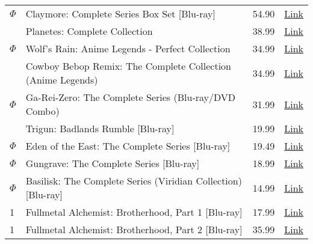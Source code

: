 \documentclass[12pt]{article}
\begin{document}
\begin{longtable}{ | p{1.3cm} | p{12cm} | l | l |}
$\Phi$ & Claymore: Complete Series Box Set [Blu-ray] & 54.90 & \href{http://www.amazon.com/Claymore-Complete-Box-Set-Blu-ray/dp/B002Y0KR66/ref=wl_it_dp_o_npd?ie=UTF8&coliid=I1CB6CCI6ECULD&colid=2CEAJ0SZHT29K}{Link} \\
& Planetes: Complete Collection & 38.99 & \href{http://www.amazon.com/Planetes-Complete-Collection-Nao-Nagasawa/dp/B000HT3876/ref=wl_it_dp_o_npd?ie=UTF8&coliid=I2E3NIZ8K55X27&colid=2CEAJ0SZHT29K}{Link} \\
$\Phi$ & Wolf's Rain: Anime Legends - Perfect Collection & 34.99 & \href{http://www.amazon.com/Wolfs-Rain-Legends-Perfect-Collection/dp/B001K98MLO/ref=sr_1_1?s=movies-tv&ie=UTF8&qid=1322589189&sr=1-1}{Link} \\
& Cowboy Bebop Remix: The Complete Collection (Anime Legends) & 34.99 & \href{http://www.amazon.com/Cowboy-Bebop-Remix-Complete-Collection/dp/B00102FF7U/ref=pd_bxgy_mov_text_c}{Link} \\
$\Phi$ & Ga-Rei-Zero: The Complete Series (Blu-ray/DVD Combo) & 31.99 & \href{http://www.amazon.com/Ga-Rei-Zero-Complete-Blu-ray-DVD-Combo/dp/B004DMIIT6/ref=pd_sim_mov_19}{Link} \\
& Trigun: Badlands Rumble [Blu-ray] & 19.99 & \href{http://www.amazon.com/Trigun-Badlands-Blu-ray-Luci-Christian/dp/B00576U9JE/ref=pd_bxgy_mov_text_c}{Link} \\
$\Phi$ & Eden of the East: The Complete Series [Blu-ray] & 19.49 & \href{http://www.amazon.com/Eden-East-Complete-Jason-Liebrecht/dp/B003SPDS8A/ref=wl_it_dp_o_pd_T1?ie=UTF8&coliid=I3CCTEO78VNIHJ&colid=2CEAJ0SZHT29K}{Link} \\
$\Phi$ & Gungrave: The Complete Series [Blu-ray] & 18.99 & \href{http://www.amazon.com/Gungrave-Complete-Blu-ray-Ron-Allen/dp/B004TP55PM/ref=sr_1_1?s=movies-tv&ie=UTF8&qid=1322588552&sr=1-1}{Link} \\
$\Phi$ & Basilisk: The Complete Series (Viridian Collection) [Blu-ray] & 14.99 & \href{http://www.amazon.com/Basilisk-Complete-Viridian-Collection-Blu-ray/dp/B002KYIAK6/ref=cm_cr_pr_product_top}{Link} \\
1 & Fullmetal Alchemist: Brotherhood, Part 1 [Blu-ray] & 17.99 & \href{http://www.amazon.com/Fullmetal-Alchemist-Brotherhood-Part-Blu-ray/dp/B0035LD7WO/ref=wl_it_dp_o_pd_T1?ie=UTF8&coliid=I25KICJFNYFFLG&colid=2CEAJ0SZHT29K}{Link} \\
1 & Fullmetal Alchemist: Brotherhood, Part 2 [Blu-ray] & 35.99 & \href{http://www.amazon.com/Fullmetal-Alchemist-Brotherhood-Part-Blu-ray/dp/B003NE8B4C/ref=wl_it_dp_o_npd?ie=UTF8&coliid=I2TWO7PQ7ZSXA7&colid=2CEAJ0SZHT29K}{Link} \\

\end{longtable}
\end{document}
